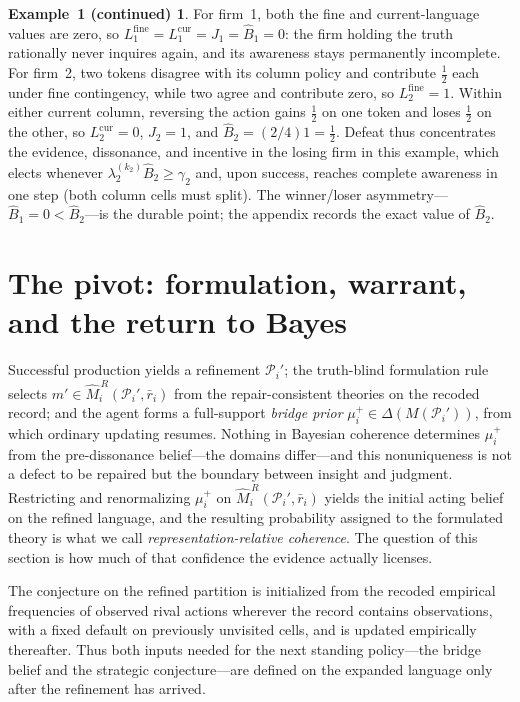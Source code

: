 \documentclass[11pt]{article}
\theoremstyle{definition}
\newtheorem*{excont}{Example~1 (continued)}
\begin{document}
\begin{excont}
For firm~1, both the fine and current-language values are zero, so $L_1^{\mathrm{fine}}=L_1^{\mathrm{cur}}=J_1=\widehat B_1=0$: the firm holding the truth rationally never inquires again, and its awareness stays permanently incomplete.
For firm~2, two tokens disagree with its column policy and contribute $\tfrac12$ each under fine contingency, while two agree and contribute zero, so $L_2^{\mathrm{fine}}=1$.
Within either current column, reversing the action gains $\tfrac12$ on one token and loses $\tfrac12$ on the other, so $L_2^{\mathrm{cur}}=0$, $J_2=1$, and $\widehat B_2=(2/4)1=\tfrac12$.
Defeat thus concentrates the evidence, dissonance, and incentive in the losing firm in this example, which elects whenever $\lambda_2^{(k_2)}\widehat B_2\geq\gamma_2$ and, upon success, reaches complete awareness in one step (both column cells must split).
The winner/loser asymmetry---$\widehat B_1=0<\widehat B_2$---is the durable point; the appendix records the exact value of $\widehat B_2$.
\end{excont}
\section{The pivot: formulation, warrant, and the return to Bayes}
\label{sec:pivot}

Successful production yields a refinement $\mathcal P_i'$; the truth-blind formulation rule selects $m'\in\widehat M_i^{\,R}(\mathcal P_i',\bar r_i)$ from the repair-consistent theories on the recoded record; and the agent forms a full-support \emph{bridge prior} $\mu_i^{+}\in\Delta(M(\mathcal P_i'))$, from which ordinary updating resumes.
Nothing in Bayesian coherence determines $\mu_i^{+}$ from the pre-dissonance belief---the domains differ---and this nonuniqueness is not a defect to be repaired but the boundary between insight and judgment.
Restricting and renormalizing $\mu_i^{+}$ on $\widehat M_i^{\,R}(\mathcal P_i',\bar r_i)$ yields the initial acting belief on the refined language, and the resulting probability assigned to the formulated theory is what we call \emph{representation-relative coherence}.
The question of this section is how much of that confidence the evidence actually licenses.

The conjecture on the refined partition is initialized from the recoded empirical frequencies of observed rival actions wherever the record contains observations, with a fixed default on previously unvisited cells, and is updated empirically thereafter.
Thus both inputs needed for the next standing policy---the bridge belief and the strategic conjecture---are defined on the expanded language only after the refinement has arrived.
\end{document}
